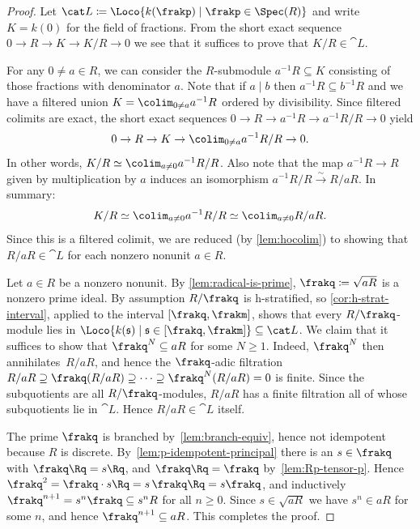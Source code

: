 \documentclass{amsart}
\numberwithin{equation}{section}%
\theoremstyle{remark}
\begin{document}
\begin{proof}
	Let $\cat L \coloneqq \Loco{k(\frakp) \mid \frakp \in \Spec(R)}$ and write $K=k(0)$ for the field of fractions. From the short exact sequence $0\to R\to K\to K/R \to 0$ we see that it suffices to prove that $K/R \in \cat L$.

	For any $0 \neq a \in R$, we can consider the $R$-submodule $a^{-1} R \subseteq K$ consisting of those fractions with denominator $a$. Note that if $a \mid b$ then $a^{-1}R \subseteq b^{-1}R$ and we have a filtered union $K = \colim_{0 \neq a} a^{-1} R$ ordered by divisibility. Since filtered colimits are exact, the short exact sequences $0 \to R \to a^{-1} R \to a^{-1}R/R \to 0$ yield 
	\[
		0 \to R \to K \to \colim_{0 \neq a} a^{-1}R/R \to 0.
	\]
	In other words, $K/R \simeq \colim_{a\neq 0} a^{-1}R/R$. Also note that the map $a^{-1} R \to R$ given by multiplication by $a$ induces an isomorphism $a^{-1}R/R \xrightarrow{\sim} R/aR$. In summary:
	\[
		K/R \simeq \colim_{a \neq 0} a^{-1}R/R \simeq \colim_{a \neq 0} R/aR.
	\]
	Since this is a filtered colimit, we are reduced (by \cref{lem:hocolim}) to showing that $R/aR \in \cat L$ for each nonzero nonunit $a \in R$. 

    Let $a \in R$ be a nonzero nonunit. By \cref{lem:radical-is-prime}, $\frakq \coloneqq \sqrt{aR}$ is a nonzero prime ideal. By assumption $R/\frakq$ is h-stratified, so \cref{cor:h-strat-interval}, applied to the interval $[\frakq,\frakm]$, shows that every $R/\frakq$-module lies in $\Loco{k(\mathfrak s) \mid \mathfrak s \in [\frakq,\frakm]} \subseteq \cat L$. We claim that it suffices to show that $\frakq^N \subseteq aR$ for some $N \ge 1$. Indeed, $\frakq^N$ then annihilates~$R/aR$, and hence the $\frakq$-adic filtration $R/aR \supseteq \frakq (R/aR) \supseteq \cdots \supseteq \frakq^N (R/aR) = 0$ is finite. Since the subquotients are all $R/\frakq$-modules, $R/aR$ has a finite filtration all of whose subquotients lie in $\cat L$. Hence $R/aR \in \cat L$ itself. 

    The prime $\frakq$ is branched by~\cref{lem:branch-equiv}, hence not idempotent because $R$ is discrete. By~\cref{lem:p-idempotent-principal} there is an $s \in \frakq$ with $\frakq \Rq = s \Rq$, and $\frakq \Rq = \frakq$ by~\cref{lem:Rp-tensor-p}. Hence $\frakq^2 = \frakq \cdot s\Rq = s\,\frakq\Rq = s\frakq$, and inductively $\frakq^{n+1} = s^n \frakq \subseteq s^nR$ for all $n \ge 0$. Since $s \in \sqrt{aR}$ we have $s^n \in aR$ for some $n$, and hence $\frakq^{n+1} \subseteq aR$. This completes the proof.
\end{proof}
\end{document}
